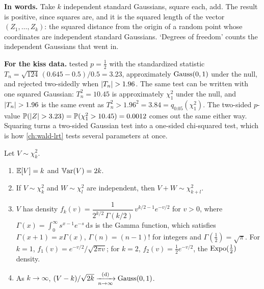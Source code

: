 \begin{inwords}
\textbf{In words.} Take $k$ independent standard Gaussians, square each, add. The result is positive, since squares are, and it is the squared length of the vector $(Z_1, \ldots, Z_k)$: the squared distance from the origin of a random point whose coordinates are independent standard Gaussians. `Degrees of freedom' counts the independent Gaussians that went in.
\par\smallskip
\textbf{For the kiss data.}  tested $p = \frac12$ with the standardized statistic $T_n = \sqrt{124}\,(0.645 - 0.5)/0.5 = 3.23$, approximately $\text{Gauss}(0,1)$ under the null, and rejected two-sidedly when $\lvert T_n\rvert > 1.96$. The same test can be written with one squared Gaussian: $T_n^2 = 10.45$ is approximately $\chi^2_1$ under the null, and $\lvert T_n\rvert > 1.96$ is the same event as $T_n^2 > 1.96^2 = 3.84 = q_{0.05}(\chi^2_1)$. The two-sided $p$-value $\mathbb{P}(\lvert Z\rvert > 3.23) = \mathbb{P}(\chi^2_1 > 10.45) = 0.0012$ comes out the same either way. Squaring turns a two-sided Gaussian test into a one-sided chi-squared test, which is how \cref{ch:wald-lrt} tests several parameters at once.
\end{inwords}

\begin{proposition}
\label{prop:chisq-props}
Let $V \sim \chi^2_k$.
\begin{enumerate}[nosep]
\item $\operatorname*{\mathbb{E}}[V] = k$ and $\operatorname*{\mathbb{V}\text{ar}}(V) = 2k$.
\item If $V \sim \chi^2_k$ and $W \sim \chi^2_l$ are independent, then $V + W \sim \chi^2_{k+l}$.
\item $V$ has density $f_k(v) = \dfrac{1}{2^{k/2}\,\Gamma(k/2)}\, v^{k/2 - 1} e^{-v/2}$ for $v > 0$, where $\Gamma(x) = \int_0^\infty s^{x-1}e^{-s}\,\mathrm{d}s$ is the Gamma function, which satisfies $\Gamma(x + 1) = x\Gamma(x)$, $\Gamma(n) = (n-1)!$ for integers and $\Gamma(\frac12) = \sqrt{\pi}$. For $k = 1$, $f_1(v) = e^{-v/2}/\sqrt{2\pi v}$; for $k = 2$, $f_2(v) = \frac12 e^{-v/2}$, the $\text{Expo}(\frac12)$ density.
\item As $k \to \infty$, $(V - k)/\sqrt{2k} \xrightarrow [n \to \infty ]{\text{(d)}} \text{Gauss}(0, 1)$.
\end{enumerate}
\end{proposition}


